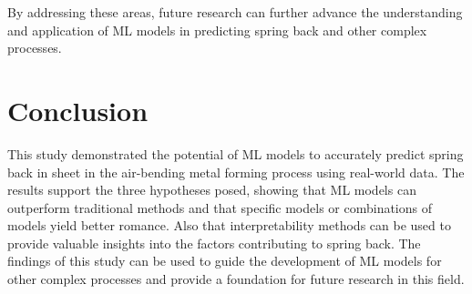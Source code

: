 By addressing these areas, future research can further advance the understanding and application of ML models in
predicting spring back and other complex processes.


\section{Conclusion}\label{sec:conclusion}
This study demonstrated the potential of \ac{ML} models to accurately predict spring back in sheet in the
air-bending metal forming process using real-world data.
The results support the three hypotheses posed, showing that \ac{ML} models can outperform traditional methods and
that specific models or combinations of models yield better romance.
Also that interpretability methods can be used to provide valuable insights into the factors contributing to
spring back.
The findings of this study can be used to guide the development of \ac{ML} models for other complex processes and
provide a foundation for future research in this field.
